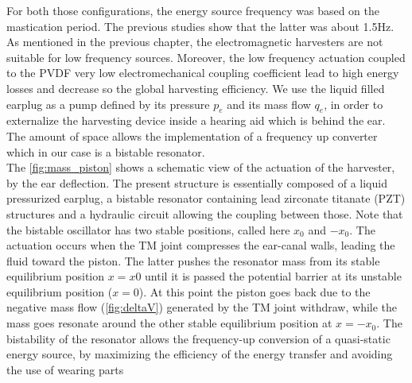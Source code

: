 \documentclass[3p,twocolumn,preprint]{elsarticle}
\begin{document}
For both those configurations, the energy source frequency was based on the mastication period. The previous studies show that the latter was about 1.5Hz. As mentioned in the previous chapter, the electromagnetic harvesters are not suitable for low frequency sources. Moreover, the low frequency actuation coupled to the PVDF very low electromechanical coupling coefficient lead to high energy losses and decrease so the global harvesting efficiency.
We use the liquid filled earplug as a pump defined by its pressure $p_e$ and its mass flow $q_e$, in order to externalize the harvesting device inside a hearing aid which is behind the ear. The amount of space allows the implementation of a frequency up converter which in our case is a bistable resonator.\\
The \cref{fig:mass_piston} shows a schematic view of the actuation of the harvester, by the ear deflection. The present structure is essentially composed of a liquid pressurized earplug, a bistable resonator containing lead zirconate titanate (PZT) structures and a hydraulic circuit allowing the coupling between those. Note that the bistable oscillator has two stable positions, called here $x_0$ and $-x_0$. The actuation occurs when the TM joint compresses the ear-canal walls, leading the fluid toward the piston. The latter pushes the resonator mass from its stable equilibrium position $x=x0$ until it is passed the potential barrier at its unstable equilibrium position ($x=0$). At this point the piston goes back due to the negative mass flow (\cref{fig:deltaV}) generated by the TM joint withdraw, while the mass goes resonate around the other stable equilibrium position at $x=-x_0$. The bistability of the resonator allows the frequency-up conversion of a quasi-static energy source, by maximizing the efficiency of the energy transfer and avoiding the use of wearing parts
\end{document}
